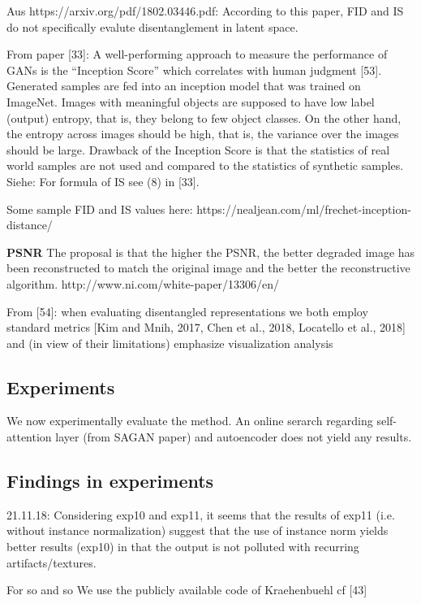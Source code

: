 \documentclass[12pt,a4paper]{article}
\begin{document}
Aus https://arxiv.org/pdf/1802.03446.pdf: According to this paper, FID and IS do not specifically evalute disentanglement in latent space.

From paper [33]: A well-performing approach to measure the performance of GANs is the
“Inception Score” which correlates with human judgment [53]. Generated samples are fed into an
inception model that was trained on ImageNet. Images with meaningful objects are supposed to
have low label (output) entropy, that is, they belong to few object classes. On the other hand, the
entropy across images should be high, that is, the variance over the images should be large. Drawback
of the Inception Score is that the statistics of real world samples are not used and compared to the
statistics of synthetic samples.
Siehe: For formula of IS see (8) in [33].
    
Some sample FID and IS values here: https://nealjean.com/ml/frechet-inception-distance/    
    
\par \textbf{PSNR} The proposal is that the higher the PSNR, the better degraded image has been reconstructed to match the original image and the better the reconstructive algorithm.
http://www.ni.com/white-paper/13306/en/
    
\par From [54]: when evaluating disentangled representations we both employ standard metrics [Kim and Mnih, 2017, Chen et al., 2018, Locatello et al., 2018] and (in view of their limitations) emphasize visualization analysis    
    
\subsection{Experiments}
We now experimentally evaluate the method. An online serarch regarding self-attention layer (from SAGAN paper) and autoencoder does not yield any results.

\subsection{Findings in experiments}
21.11.18: Considering exp10 and exp11, it seems that the results of exp11 (i.e. without instance normalization) suggest that the use of instance norm yields better results (exp10) in that the output is not polluted with recurring artifacts/textures.

\par For so and so We use the publicly available code of Kraehenbuehl cf [43]
\end{document}

